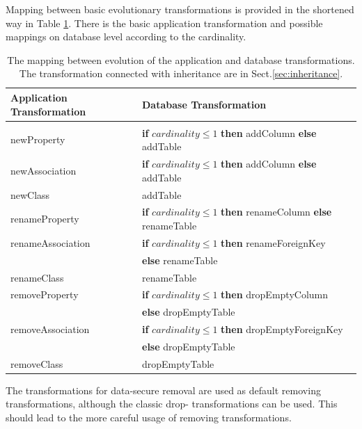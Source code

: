 \documentclass[runningheads]{comsis}
\begin{document}
Mapping between basic evolutionary transformations is provided in the shortened way in Table \ref{tab:sw-basic-evolution}. There is the basic application transformation and possible mappings on database level according to the cardinality.  
\begin{table}
	\caption{The mapping between evolution of the application and database transformations. The  transformation connected with inheritance are in Sect.\ref{sec:inheritance}. }
	\label{tab:sw-basic-evolution}
\centering
	\begin{tabular}{ll}
		\hline
	Application Transformation & Database Transformation \\
	\hline
	\\[-2ex] 
	newProperty & \textbf{if} $cardinality \leq 1$ \textbf{then} addColumn \textbf{else} addTable \\ 

	newAssociation & \textbf{if} $cardinality \leq 1$ \textbf{then} addColumn  \textbf{else} addTable \\

	newClass & addTable \\
	renameProperty & \textbf{if} $cardinality \leq 1$ \textbf{then}  renameColumn  \textbf{else} renameTable \\

	renameAssociation & \textbf{if} $cardinality \leq 1$ \textbf{then} renameForeignKey \\ & \hspace{1in} \textbf{else} renameTable \\
	
	renameClass & renameTable \\
	removeProperty & \textbf{if} $cardinality \leq 1$ \textbf{then} dropEmptyColumn  \\ & \hspace{1in}\textbf{else} dropEmptyTable \\
	
	removeAssociation & \textbf{if} $cardinality \leq 1$ \textbf{then}  dropEmptyForeignKey \\ & \hspace{1in} \textbf{else} dropEmptyTable \\
	removeClass & dropEmptyTable\\
	\hline
	\end{tabular}
\end{table}
The transformations for data-secure removal are used as default removing transformations, although the classic drop- transformations can be used. This should lead to the more careful usage of removing transformations.
\end{document}
